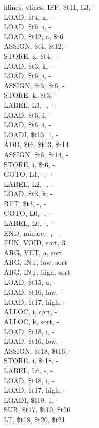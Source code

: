 \documentclass[
	12pt,				%
	oneside,
	a4paper,			%
	english,			%
	french,				%
	spanish,			%
	brazil,				%
	]{abntex2}
\begin{document}
\begin{longtblr}[
  caption = {Código Intermediário},
  label = {tab: ResultadosSortIntermediario},
]{
  hlines,
  vlines,
}
IFF, \$t11, L3, -\\
LOAD, \$t4, x, -\\
LOAD, \$t6, i, -\\
LOAD, \$t12, a, \$t6\\
ASSIGN, \$t4, \$t12, -\\
STORE, x, \$t4, -\\
LOAD, \$t3, k, -\\
LOAD, \$t6, i, -\\
ASSIGN, \$t3, \$t6, -\\
STORE, k, \$t3, -\\
LABEL, L3, -, -\\
LOAD, \$t6, i, -\\
LOAD, \$t6, i, -\\
LOADI, \$t13, 1, -\\
ADD, \$t6, \$t13, \$t14\\
ASSIGN, \$t6, \$t14, -\\
STORE, i, \$t6, -\\
GOTO, L1, -, -\\
LABEL, L2, -, -\\
LOAD, \$t3, k, -\\
RET, \$t3, -, -\\
GOTO, L0, -, -\\
LABEL, L0, -, -\\
END, minloc, -, -\\
FUN, VOID, sort, 3\\
ARG, VET, a, sort\\
ARG, INT, low, sort\\
ARG, INT, high, sort\\
LOAD, \$t15, a, -\\
LOAD, \$t16, low, -\\
LOAD, \$t17, high, -\\
ALLOC, i, sort, -\\
ALLOC, k, sort, -\\
LOAD, \$t18, i, -\\
LOAD, \$t16, low, -\\
ASSIGN, \$t18, \$t16, -\\
STORE, i, \$t18, -\\
LABEL, L6, -, -\\
LOAD, \$t18, i, -\\
LOAD, \$t17, high, -\\
LOADI, \$t19, 1, -\\
SUB, \$t17, \$t19, \$t20\\
LT, \$t18, \$t20, \$t21\\

\end{longtblr}
\end{document}
